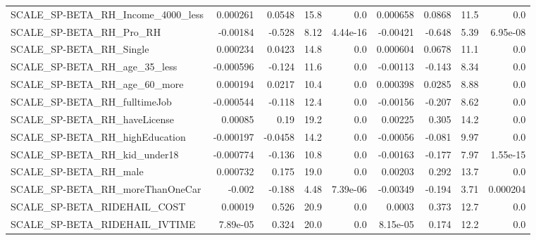 \begin{tabular}{lrrrrrrrr}
SCALE\_SP-BETA\_RH\_Income\_4000\_less                  &    0.000261 &       0.0548 &      15.8 &      0.0 &   0.000658 &      0.0868 &         11.5 &           0.0 \\
SCALE\_SP-BETA\_RH\_Pro\_RH                            &    -0.00184 &       -0.528 &      8.12 & 4.44e-16 &   -0.00421 &      -0.648 &         5.39 &      6.95e-08 \\
SCALE\_SP-BETA\_RH\_Single                            &    0.000234 &       0.0423 &      14.8 &      0.0 &   0.000604 &      0.0678 &         11.1 &           0.0 \\
SCALE\_SP-BETA\_RH\_age\_35\_less                       &   -0.000596 &       -0.124 &      11.6 &      0.0 &   -0.00113 &      -0.143 &         8.34 &           0.0 \\
SCALE\_SP-BETA\_RH\_age\_60\_more                       &    0.000194 &       0.0217 &      10.4 &      0.0 &   0.000398 &      0.0285 &         8.88 &           0.0 \\
SCALE\_SP-BETA\_RH\_fulltimeJob                       &   -0.000544 &       -0.118 &      12.4 &      0.0 &   -0.00156 &      -0.207 &         8.62 &           0.0 \\
SCALE\_SP-BETA\_RH\_haveLicense                       &     0.00085 &         0.19 &      19.2 &      0.0 &    0.00225 &       0.305 &         14.2 &           0.0 \\
SCALE\_SP-BETA\_RH\_highEducation                     &   -0.000197 &      -0.0458 &      14.2 &      0.0 &   -0.00056 &      -0.081 &         9.97 &           0.0 \\
SCALE\_SP-BETA\_RH\_kid\_under18                       &   -0.000774 &       -0.136 &      10.8 &      0.0 &   -0.00163 &      -0.177 &         7.97 &      1.55e-15 \\
SCALE\_SP-BETA\_RH\_male                              &    0.000732 &        0.175 &      19.0 &      0.0 &    0.00203 &       0.292 &         13.7 &           0.0 \\
SCALE\_SP-BETA\_RH\_moreThanOneCar                    &      -0.002 &       -0.188 &      4.48 & 7.39e-06 &   -0.00349 &      -0.194 &         3.71 &      0.000204 \\
SCALE\_SP-BETA\_RIDEHAIL\_COST                        &     0.00019 &        0.526 &      20.9 &      0.0 &     0.0003 &       0.373 &         12.7 &           0.0 \\
SCALE\_SP-BETA\_RIDEHAIL\_IVTIME                      &    7.89e-05 &        0.324 &      20.0 &      0.0 &   8.15e-05 &       0.174 &         12.2 &           0.0 \\

\end{tabular}
